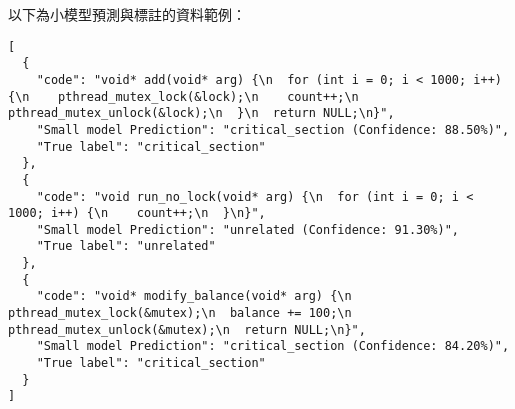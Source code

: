 \documentclass[12pt]{article}
\begin{document}
以下為小模型預測與標註的資料範例：

\begin{lstlisting}
[
  {
    "code": "void* add(void* arg) {\n  for (int i = 0; i < 1000; i++) {\n    pthread_mutex_lock(&lock);\n    count++;\n    pthread_mutex_unlock(&lock);\n  }\n  return NULL;\n}",
    "Small model Prediction": "critical_section (Confidence: 88.50%)",
    "True label": "critical_section"
  },
  {
    "code": "void run_no_lock(void* arg) {\n  for (int i = 0; i < 1000; i++) {\n    count++;\n  }\n}",
    "Small model Prediction": "unrelated (Confidence: 91.30%)",
    "True label": "unrelated"
  },
  {
    "code": "void* modify_balance(void* arg) {\n  pthread_mutex_lock(&mutex);\n  balance += 100;\n  pthread_mutex_unlock(&mutex);\n  return NULL;\n}",
    "Small model Prediction": "critical_section (Confidence: 84.20%)",
    "True label": "critical_section"
  }
]
\end{lstlisting}
\end{document}
